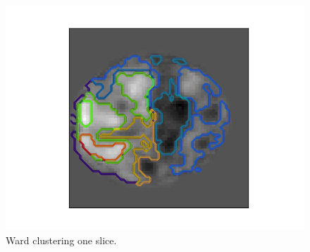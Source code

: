 



\begin{figure}[ht]
\centering
\includegraphics[scale=0.5]{images/clustering1}  
\caption{Ward clustering one slice.}
\label{fig:mask}
\end{figure}


